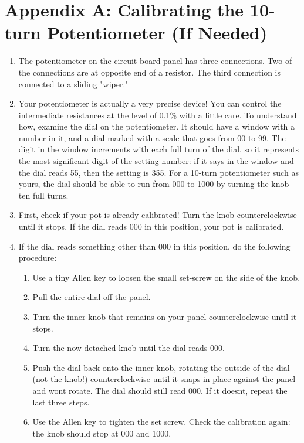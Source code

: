 \documentclass[10pt]{PhysLab1C} %
\begin{document}
\section*{Appendix A: Calibrating the 10-turn Potentiometer (If Needed)}


\begin{enumerate}
\def\labelenumi{\arabic{enumi}.}
\item
  The potentiometer on the circuit board panel has three connections.
  Two of the connections are at opposite end of a resistor. The third
  connection is connected to a sliding "wiper."
\item
  Your potentiometer is actually a very precise device! You can control
  the intermediate resistances at the level of 0.1\% with a little care.
  To understand how, examine the dial on the potentiometer. It should
  have a window with a number in it, and a dial marked with a scale that
  goes from 00 to 99. The digit in the window increments with each full
  turn of the dial, so it represents the most significant digit of the
  setting number: if it says \textquotesingle{} in the
  window and the dial reads 55, then the setting is 355. For a 10-turn
  potentiometer such as yours, the dial should be able to run from 000
  to 1000 by turning the knob ten full turns.
\item
  First, check if your pot is already calibrated! Turn the knob
  counterclockwise until it stops. If the dial reads 000 in this
  position, your pot is calibrated.
\item
  If the dial reads something other than 000 in this position, do the
  following procedure:

  \begin{enumerate}
  \def\labelenumii{\arabic{enumii}.}
  \item
    Use a tiny Allen key to loosen the small set-screw on the side of
    the knob.
  \item
    Pull the entire dial off the panel.
  \item
    Turn the inner knob that remains on your panel counterclockwise
    until it stops.
  \item
    Turn the now-detached knob until the dial reads 000.
  \item
    Push the dial back onto the inner knob, rotating the outside of the
    dial (not the knob!) counterclockwise until it snaps in place
    against the panel and won\textquotesingle t rotate. The dial should
    still read 000. If it doesn\textquotesingle t, repeat the last three
    steps.
  \item
    Use the Allen key to tighten the set screw. Check the calibration
    again: the knob should stop at 000 and 1000.
  \end{enumerate}
\end{enumerate}

\end{document}
